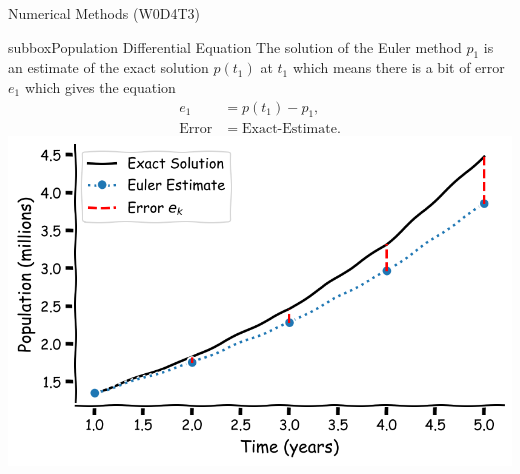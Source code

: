 \begin{textbox}{Numerical Methods (W0D4T3) }
\begin{subbox}{subbox}{Population Differential Equation}
The solution of the Euler method $p_1$ is an estimate of the exact solution $p(t_1)$ at $t_1$ which means there is a bit of error $e_1$ which gives the equation
\begin{align*}
e_1&=p(t_1)-p_1,\\
\text{Error}&=\text{Exact-Estimate}.
\end{align*}
\centering
\includegraphics[scale=0.12]{Figures/PreCourse/CFigure7.png}
\end{subbox}

\end{textbox}
